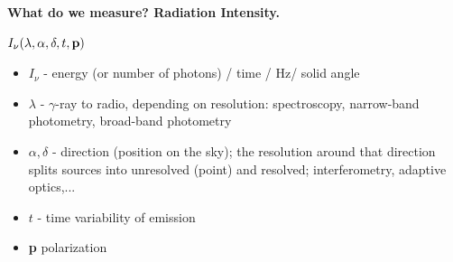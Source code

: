 \documentclass[letterpaper,landscape]{slides}
\begin{document}






\begin{slide}
	\begin{center}
		\bfseries
		{\large {\color{red} What do we measure? \color{blue} Radiation Intensity.}}
	\end{center}
	\vskip 0.6in
	
	{\centerline {\Huge \bf {\color{blue} 
				$I_\nu (\lambda, \alpha, \delta, t, {\bf p})$ }}}
	
	\begin{itemize}
		
		\item $I_\nu$ - energy (or number of photons) / time / Hz/ solid angle 
		\item $\lambda$ - $\gamma$-ray to radio, depending on resolution:
		spectroscopy, narrow-band photometry, broad-band photometry
		\item $\alpha, \delta$ - direction (position on the sky); the resolution 
		around that direction splits sources into unresolved (point) and resolved;
		interferometry, adaptive optics,...
		\item $t$ - time variability of emission
		\item {\bf p} polarization
	\end{itemize}
\end{slide}

\end{document}
